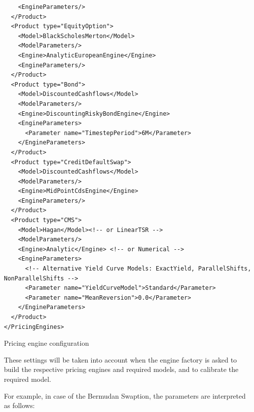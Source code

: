 \documentclass[12pt, a4paper]{article}
\newenvironment{longlisting}{\captionsetup{type=listing}}{}
\begin{document}
\begin{longlisting}
\begin{verbatim}
    <EngineParameters/>
  </Product>
  <Product type="EquityOption">
    <Model>BlackScholesMerton</Model>
    <ModelParameters/>
    <Engine>AnalyticEuropeanEngine</Engine>
    <EngineParameters/>
  </Product>
  <Product type="Bond">
    <Model>DiscountedCashflows</Model>
    <ModelParameters/>
    <Engine>DiscountingRiskyBondEngine</Engine>
    <EngineParameters>
      <Parameter name="TimestepPeriod">6M</Parameter>
    </EngineParameters>
  </Product>
  <Product type="CreditDefaultSwap">
    <Model>DiscountedCashflows</Model>
    <ModelParameters/>
    <Engine>MidPointCdsEngine</Engine>
    <EngineParameters/>
  </Product>
  <Product type="CMS">
    <Model>Hagan</Model><!-- or LinearTSR -->
    <ModelParameters/>
    <Engine>Analytic</Engine> <!-- or Numerical -->
    <EngineParameters>
      <!-- Alternative Yield Curve Models: ExactYield, ParallelShifts, NonParallelShifts -->
      <Parameter name="YieldCurveModel">Standard</Parameter> 
      <Parameter name="MeanReversion">0.0</Parameter>
    </EngineParameters>
  </Product>
</PricingEngines>
\end{verbatim}
\caption{Pricing engine configuration}
\label{lst:pricingengine_config}
\end{longlisting}

These settings will be taken into account when the engine factory is asked to build the respective pricing engines and required models, and to calibrate the required model.

\medskip
For example, in case of the Bermudan Swaption, the parameters are interpreted as follows:
\end{document}
